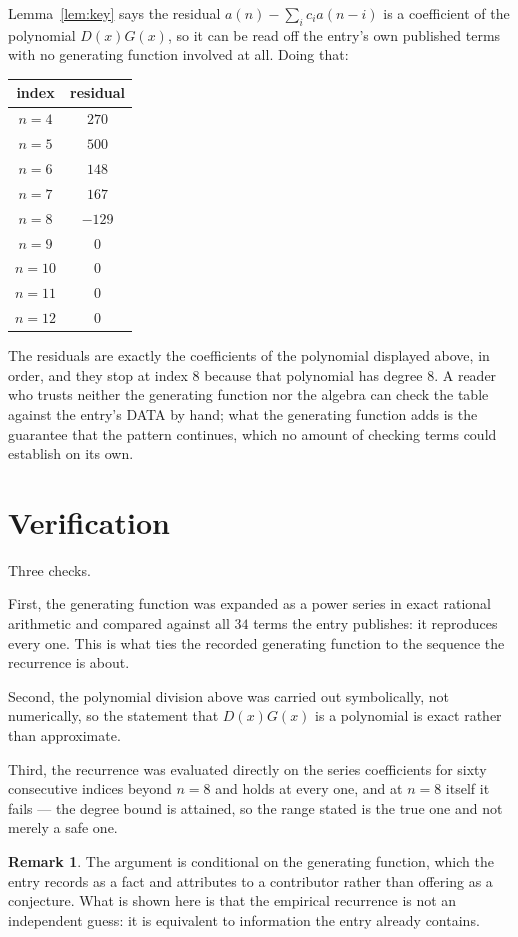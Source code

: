 \documentclass[11pt,a4paper]{article}
\theoremstyle{plain}
\theoremstyle{definition}
\newtheorem{remark}[theorem]{Remark}
\begin{document}
Lemma~\ref{lem:key} says the residual $a(n)-\sum_ic_ia(n-i)$ is a coefficient of the
polynomial $D(x)G(x)$, so it can be read off the entry's own published terms with no
generating function involved at all. Doing that:
\begin{center}
\begin{tabular}{cc}
index & residual \\ \hline
$n=4$ & $270$ \\
$n=5$ & $500$ \\
$n=6$ & $148$ \\
$n=7$ & $167$ \\
$n=8$ & $-129$ \\
$n=9$ & $0$ \\
$n=10$ & $0$ \\
$n=11$ & $0$ \\
$n=12$ & $0$
\end{tabular}
\end{center}
The residuals are exactly the coefficients of the polynomial displayed above, in order, and
they stop at index $8$ because that polynomial has degree $8$. A reader who trusts
neither the generating function nor the algebra can check the table against the entry's DATA
by hand; what the generating function adds is the guarantee that the pattern continues, which
no amount of checking terms could establish on its own.

\section{Verification}

Three checks.

First, the generating function was expanded as a power series in exact rational arithmetic and
compared against all $34$ terms the entry publishes: it reproduces every one. This is
what ties the recorded generating function to the sequence the recurrence is about.

Second, the polynomial division above was carried out symbolically, not numerically, so the
statement that $D(x)G(x)$ is a polynomial is exact rather than approximate.

Third, the recurrence was evaluated directly on the series coefficients for sixty consecutive
indices beyond $n=8$ and holds at every one, and at $n=8$ itself it fails --- the
degree bound is attained, so the range stated is the true one and not merely a safe one.

\begin{remark}
The argument is conditional on the generating function, which the entry records as a fact and
attributes to a contributor rather than offering as a conjecture. What is shown here is that
the empirical recurrence is not an independent guess: it is equivalent to information the
entry already contains.
\end{remark}
\end{document}
